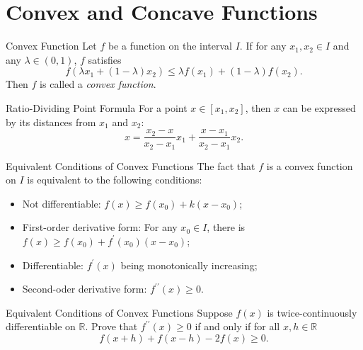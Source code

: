 \section{Convex and Concave Functions}

\begin{definition}{Convex Function}{}
  Let $f$ be a function on the interval $I$.
  If for any $x_1, x_2 \in I$ and any $\lambda \in (0, 1)$,
  $f$ satisfies
  \begin{equation}
    f \left( \lambda x_1 + (1-\lambda)x_2 \right) \leq \lambda f(x_1) + (1-\lambda)f(x_2).
  \end{equation}
  Then $f$ is called a \emph{convex function}.
\end{definition}

\begin{lemma}{Ratio-Dividing Point Formula}{}
  For a point $x \in [x_1, x_2]$, then $x$ can be expressed by
  its distances from $x_1$ and $x_2$:
  \begin{equation}
    x = \frac{x_2 - x}{x_2 - x_1}x_1 + \frac{x - x_1}{x_2 - x_1}x_2.
  \end{equation}
\end{lemma}

\begin{proposition}{Equivalent Conditions of Convex Functions}{}
  The fact that $f$ is a convex function on $I$ is equivalent to
  the following conditions:
  \begin{itemize}
  \item Not differentiable: $f(x) \geq f(x_0) + k(x - x_0)$;
  \item First-order derivative form: For any $x_0 \in I$,
    there is $f(x) \geq f(x_0) + f^{\prime}(x_0) (x - x_0)$;
  \item Differentiable: $f^{\prime}(x)$ being monotonically increasing;
  \item Second-oder derivative form: $f^{\prime\prime}(x) \geq 0$.
  \end{itemize}
\end{proposition}

\begin{example}{Equivalent Conditions of Convex Functions}{}
  Suppose $f(x)$ is twice-continuously differentiable on $\mathbb{R}$.
  Prove that $f^{\prime\prime}(x) \geq 0$ if and only if for all $x,h \in \mathbb{R}$
  \begin{equation}
    f(x+h) + f(x-h) -2f(x) \geq 0.
  \end{equation}
\end{example}

